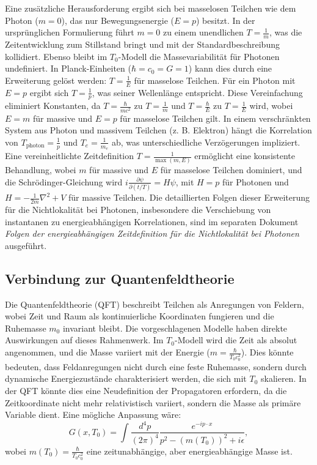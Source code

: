 \documentclass[a4paper,12pt]{article}
\begin{document}
	Eine zusätzliche Herausforderung ergibt sich bei masselosen Teilchen wie dem Photon (\( m = 0 \)), das nur Bewegungsenergie (\( E = p \)) besitzt. In der ursprünglichen Formulierung führt \( m = 0 \) zu einem unendlichen \( T = \frac{1}{m} \), was die Zeitentwicklung zum Stillstand bringt und mit der Standardbeschreibung kollidiert. Ebenso bleibt im \( T_0 \)-Modell die Massevariabilität für Photonen undefiniert. In Planck-Einheiten (\( \hbar = c_0 = G = 1 \)) kann dies durch eine Erweiterung gelöst werden: \( T = \frac{1}{E} \) für masselose Teilchen. Für ein Photon mit \( E = p \) ergibt sich \( T = \frac{1}{p} \), was seiner Wellenlänge entspricht. Diese Vereinfachung eliminiert Konstanten, da \( T = \frac{\hbar}{m c^2} \) zu \( T = \frac{1}{m} \) und \( T = \frac{\hbar}{E} \) zu \( T = \frac{1}{E} \) wird, wobei \( E = m \) für massive und \( E = p \) für masselose Teilchen gilt. In einem verschränkten System aus Photon und massivem Teilchen (z. B. Elektron) hängt die Korrelation von \( T_\text{photon} = \frac{1}{p} \) und \( T_e = \frac{1}{m_e} \) ab, was unterschiedliche Verzögerungen impliziert. Eine vereinheitlichte Zeitdefinition \( T = \frac{1}{\max(m, E)} \) ermöglicht eine konsistente Behandlung, wobei \( m \) für massive und \( E \) für masselose Teilchen dominiert, und die Schrödinger-Gleichung wird \( i \frac{\partial \psi}{\partial (t/T)} = H \psi \), mit \( H = p \) für Photonen und \( H = -\frac{1}{2m} \nabla^2 + V \) für massive Teilchen. Die detaillierten Folgen dieser Erweiterung für die Nichtlokalität bei Photonen, insbesondere die Verschiebung von instantanen zu energieabhängigen Korrelationen, sind im separaten Dokument \textit{Folgen der energieabhängigen Zeitdefinition für die Nichtlokalität bei Photonen} ausgeführt.
	
	\subsection{Verbindung zur Quantenfeldtheorie}
	Die Quantenfeldtheorie (QFT) beschreibt Teilchen als Anregungen von Feldern, wobei Zeit und Raum als kontinuierliche Koordinaten fungieren und die Ruhemasse \( m_0 \) invariant bleibt. Die vorgeschlagenen Modelle haben direkte Auswirkungen auf dieses Rahmenwerk. Im \( T_0 \)-Modell wird die Zeit als absolut angenommen, und die Masse variiert mit der Energie (\( m = \frac{\hbar}{T_0 c_0^2} \)). Dies könnte bedeuten, dass Feldanregungen nicht durch eine feste Ruhemasse, sondern durch dynamische Energiezustände charakterisiert werden, die sich mit \( T_0 \) skalieren. In der QFT könnte dies eine Neudefinition der Propagatoren erfordern, da die Zeitkoordinate nicht mehr relativistisch variiert, sondern die Masse als primäre Variable dient. Eine mögliche Anpassung wäre:
	\[
	G(x, T_0) = \int \frac{d^4p}{(2\pi)^4} \frac{e^{-ip \cdot x}}{p^2 - (m(T_0))^2 + i\epsilon},
	\]
	wobei \( m(T_0) = \frac{\hbar}{T_0 c_0^2} \) eine zeitunabhängige, aber energieabhängige Masse ist.
	
\end{document}
